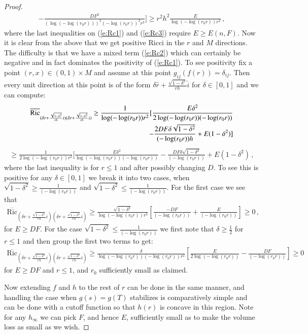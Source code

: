 \documentclass[11pt]{article}
\newcommand{\Ric}{\text{Ric}}
\begin{document}
\begin{proof}
\begin{align}
-  \frac{DF^{2}}{(\log (-\log (r_0r)))^{2}(-\log (r_0r))^{2}r^{2}}]\geq r^{2}h^{2}\frac{E}{\log (-\log (r_0r))r^{2}}\, ,
\end{align}
where the last inequalities on (\ref{e:Rc1}) and (\ref{e:Rc3}) require $E\geq E(n,F)$.  Now it is clear from the above that we get positive Ricci in the $r$ and $M$ directions.  The difficulty is that we have a mixed term (\ref{e:Rc2}) which can certainly be negative and in fact dominates the positivity of (\ref{e:Rc1}). To see positivity fix a point $(r,x)\in (0,1)\times M$ and assume at this point $g_{ij}(f(r))=\delta_{ij}$.  Then every unit direction at this point is of the form $\delta \hat{r}+\frac{\sqrt{1-\delta^{2}}}{rh}\hat{i}$ for $\delta\in [0,1]$ and we can compute:
\begin{align}
 \overline{\Ric}_{(\delta r+\frac{\sqrt{1-\delta^{2}}}{rh}i)(\delta r+\frac{\sqrt{1-\delta^{2}}}{rh}i)}
 \geq \frac{1}{\log (-\log (r_0r))r^{2}}[\frac{E\delta^{2}}{2\log (-\log (r_0r))(-\log (r_0r))}\notag\\
- \frac{2DF\delta\sqrt{1-\delta^{2}}}{(-\log (r_0r))h} + E(1-\delta^{2})]
\end{align}
\begin{align}
\geq \frac{1}{2\log (-\log (r_0r))r^{2}}[\frac{E\delta^{2}}{\log (-\log (r_0r))(-\log(r_0r))} - \frac{DF\delta\sqrt{1-\delta^{2}}}{(-\log(r_0r))} + E(1-\delta^{2})\, ,
\end{align}
where the last inequality is for $r\leq 1$ and after possibly changing $D$.  To see this is positive for any $\delta\in [0,1]$ we break it into two cases, when $\sqrt{1-\delta^{2}}\geq \frac{1}{(-\log (r_0r))}$ and $\sqrt{1-\delta^{2}}\leq \frac{1}{(-\log (r_0r))}$.  For the first case we see that
\begin{align}
 \overline{\Ric}_{(\delta r+\frac{\sqrt{1-\delta^{2}}}{rh}i)(\delta r+\frac{\sqrt{1-\delta^{2}}}{rh}i)} \geq \frac{\sqrt{1-\delta^{2}}}{\log (-\log (r_0r))r^{2}}[\frac{-DF}{(-\log(r_0r))}+\frac{E}{(-\log(r_0r))}] \geq 0\, ,
\end{align}
for $E\geq DF$.  For the case $\sqrt{1-\delta^{2}}\leq \frac{1}{(-\log(r_0r))}$ we first note that $\delta\geq \frac{1}{2}$ for $r\leq 1$ and then group the first two terms to get:
\begin{align}
 \overline{\Ric}_{(\delta r+\frac{\sqrt{1-\delta^{2}}}{rh}i)(\delta r+\frac{\sqrt{1-\delta^{2}}}{rh}i)} \geq \frac{\delta}{\log (-\log (r_0r))(-\log (r_0r))r^{2}}[\frac{E}{2\log (-\log (r_0r))}-\frac{DF}{(-\log (r_0r))}] \geq 0
\end{align}
for $E\geq DF$ and $r\leq 1$, and $r_0$ sufficiently small as claimed.

Now extending $f$ and $h$ to the rest of $r$ can be done in the same manner, and handling the case when $g(s)=g(T)$ stabilizes is comparatively simple and can be done with a cutoff function so that $h(r)$ is concave in this region.  Note for any $h_\infty$ we can pick $F$, and hence $E$, sufficiently small as to make the volume loss as small as we wish.
\end{proof}
\end{document}
